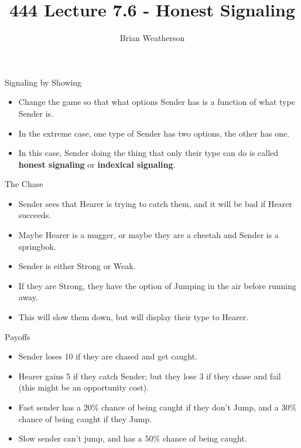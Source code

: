 \documentclass[
  ignorenonframetext,
]{beamer}
\title{444 Lecture 7.6 - Honest Signaling}
\author{Brian Weatherson}
\date{}
\providecommand{\tightlist}{%
  \setlength{\itemsep}{0pt}\setlength{\parskip}{0pt}}
\begin{document}
\frame{\titlepage}

\begin{frame}{Signaling by Showing}
\protect\hypertarget{signaling-by-showing}{}
\begin{itemize}
\tightlist
\item
  Change the game so that what options Sender has is a function of what
  type Sender is.
\item
  In the extreme case, one type of Sender has two options, the other has
  one.
\item
  In this case, Sender doing the thing that only their type can do is
  called \textbf{honest signaling} or \textbf{indexical signaling}.
\end{itemize}
\end{frame}

\begin{frame}{The Chase}
\protect\hypertarget{the-chase}{}
\begin{itemize}
\tightlist
\item
  Sender sees that Hearer is trying to catch them, and it will be bad if
  Hearer succeeds.
\item
  Maybe Hearer is a mugger, or maybe they are a cheetah and Sender is a
  springbok.
\item
  Sender is either Strong or Weak.
\item
  If they are Strong, they have the option of Jumping in the air before
  running away.
\item
  This will slow them down, but will display their type to Hearer.
\end{itemize}
\end{frame}

\begin{frame}{Payoffs}
\protect\hypertarget{payoffs}{}
\begin{itemize}
\tightlist
\item
  Sender loses 10 if they are chased and get caught.
\item
  Hearer gains 5 if they catch Sender; but they lose 3 if they chase and
  fail (this might be an opportunity cost).
\item
  Fast sender has a 20\% chance of being caught if they don't Jump, and
  a 30\% chance of being caught if they Jump.
\item
  Slow sender can't jump, and has a 50\% chance of being caught.
\end{itemize}
\end{frame}
\end{document}
